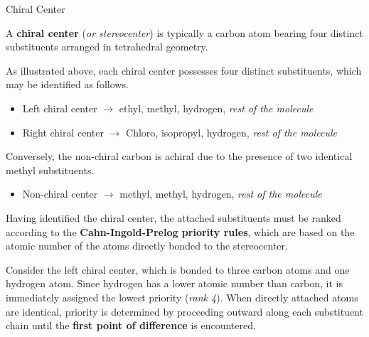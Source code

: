 \documentclass[10pt]{article}
\begin{document}
      \begin{core}[label=core:chiral]{Chiral Center}

        A \textbf{chiral center} (\textit{or stereocenter}) is typically a carbon atom bearing four distinct substituents arranged in tetrahedral geometry.


        As illustrated above, each chiral center possesses four distinct substituents, which may be identified as follows.

        \begin{itemize}

          \item Left chiral center $\rightarrow$ ethyl, methyl, hydrogen, \textit{rest of the molecule}

          \item Right chiral center $\rightarrow$ Chloro, isopropyl, hydrogen, \textit{rest of the molecule}

        \end{itemize}

        Conversely, the non-chiral carbon is achiral due to the presence of two identical methyl substituents.

        \begin{itemize}

          \item Non-chiral center $\rightarrow$ methyl, methyl, hydrogen, \textit{rest of the molecule}

        \end{itemize}

        Having identified the chiral center, the attached substituents must be ranked according to the \textbf{Cahn-Ingold-Prelog priority rules}, which are based on the atomic number of the atoms directly bonded to the stereocenter.

        Consider the left chiral center, which is bonded to three carbon atoms and one hydrogen atom. Since hydrogen has a lower atomic number than carbon, it is immediately assigned the lowest priority (\textit{rank 4}). When directly attached atoms are identical, priority is determined by proceeding outward along each substituent chain until the \textbf{first point of difference} is encountered.


\end{core}
\end{document}
